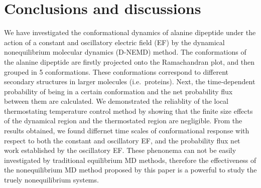 \documentclass[a4paper,preprint,unsortedaddress,onecolumn]{revtex4-1}
\newcommand{\recheck}[1]{{\color{red} #1}}
\begin{document}
\section{Conclusions and discussions}

We have investigated the conformational
dynamics of alanine dipeptide under the action of a constant and oscillatory electric
field (EF) by the dynamical nonequilibrium molecular dynamics (D-NEMD) method.
The conformations of the alanine dipeptide are
firstly projected onto the Ramachandran plot, and
then grouped in 5  conformations.
These conformations
correspond to different secondary structures in larger molecules
(i.e.~proteins).
Next, the time-dependent probability
of being in a certain conformation and the net probability flux
between them are calculated.
\recheck{
  We demonstrated the reliablity
  of the local thermostating temperature control method
  by showing that the finite size effects of the
  dynamical region and the thermostated region are negligible.  
  From the results obtained, we found differnet time scales of
  conformational response with respect to both the constant  and
  oscillatory EF, and the probability flux net work established
  by the oscillatory EF. These phenonema can not be easily investigated
  by traditional equilibrium MD methods, therefore the effectiveness of
  the nonequilibrium MD method proposed by this paper
  is a powerful to study the truely nonequilibrium systems.
}
\end{document}
